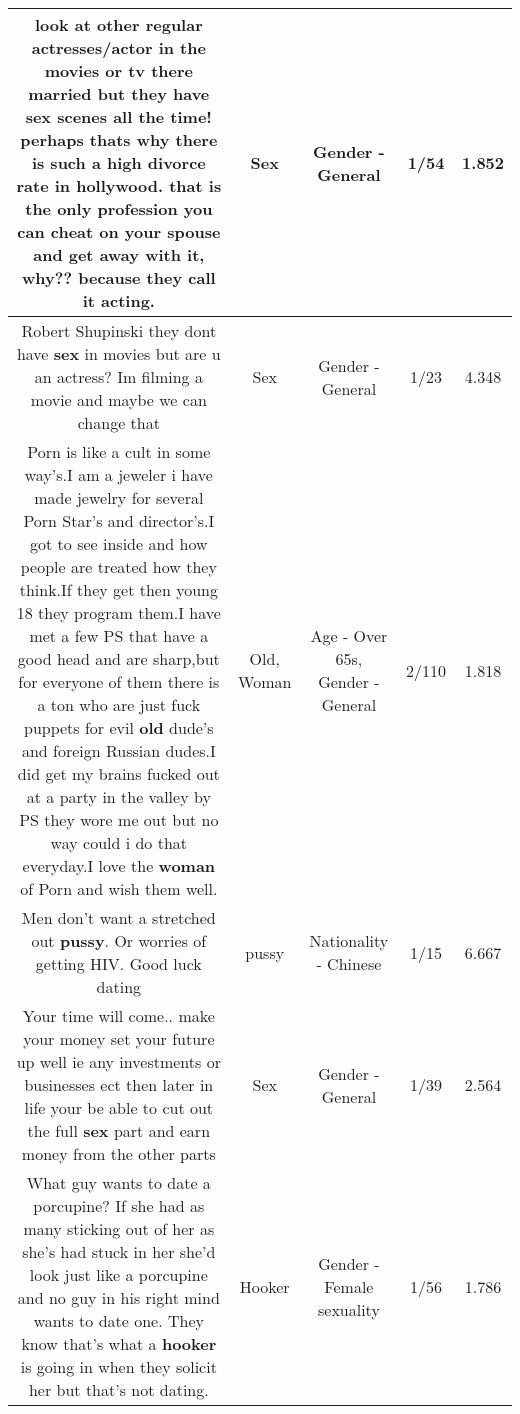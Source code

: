 \documentclass[11pt]{article}
\newlength\mylength
\begin{document}
\begin{center}
\begin{longtable}{|C{.65\mylength}|C{.30\mylength}|C{.12\mylength}|C{.12\mylength}|C{.12\mylength}|}
  \small look at other regular actresses/actor in the movies or tv there married but they have \textbf{sex} scenes all the time! perhaps thats why there is such a high divorce rate in hollywood. that is the only profession you can cheat on your spouse and get away with it, why?? because they call it acting.\normalsize   & Sex & Gender - General & 1/54 & 1.852 \\  \hline
  \small Robert Shupinski they dont have \textbf{sex} in movies but are u an actress? Im filming a movie and maybe we can change that\normalsize   & Sex & Gender - General & 1/23 & 4.348 \\  \hline
  \small Porn is like a cult in some way's.I am a jeweler i have made jewelry for several Porn Star's and director's.I got to see inside and how people are treated how they think.If they get then young 18 they program them.I have met a few PS that have a good head and are sharp,but for everyone of them there is a ton who are just fuck puppets for evil \textbf{old} dude's and foreign Russian dudes.I did get my brains fucked out at a party in the valley by PS they wore me out but no way could i do that everyday.I love the \textbf{woman} of Porn and wish them well.\normalsize   & Old, Woman & Age - Over 65s, Gender - General & 2/110 & 1.818 \\  \hline
  \small Men don't want a stretched out \textbf{pussy}. Or worries of getting HIV.  Good luck dating\normalsize   & pussy & Nationality - Chinese & 1/15 & 6.667 \\  \hline
  \small Your time will come.. make your money set your future up well ie any investments or businesses ect then later in life your be able to cut out the full \textbf{sex} part and earn money from the other parts\normalsize   & Sex & Gender - General & 1/39 & 2.564 \\  \hline
  \small What guy wants to date a porcupine? If she had as many sticking out of her as she's had stuck in her she'd look just like a porcupine and no guy in his right mind wants to date one. They know that's what a \textbf{hooker} is going in when they solicit her but that's not dating.\normalsize   & Hooker & Gender - Female sexuality & 1/56 & 1.786 \\  \hline

\end{longtable}
\end{center}
\end{document}

